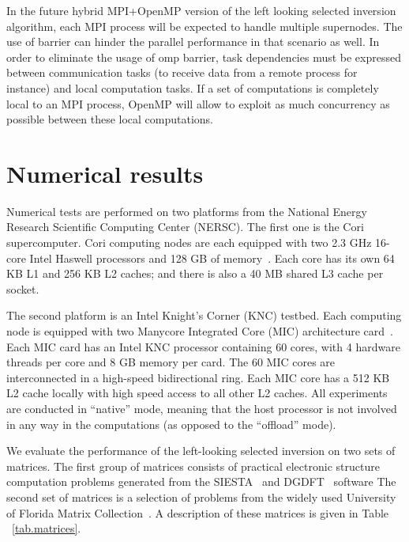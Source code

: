 \documentclass[10pt, conference, compsocconf,letterpaper,twocolumn]{IEEEtran}
\newcommand{\dgdft}{\textsf{DGDFT}\xspace}
\newcommand{\siesta}{\textsf{SIESTA}\xspace}
\begin{document}
In the future hybrid MPI+OpenMP version of the left looking selected inversion algorithm, each MPI process will be expected to handle multiple supernodes. The use of barrier can hinder the parallel performance in that scenario as well. In order to eliminate the usage of \textsf{omp barrier}, task dependencies must be expressed between communication tasks (to receive data from a remote process for instance) and local computation tasks. If a set of computations is completely local to an MPI process, OpenMP will allow to exploit as much concurrency as possible between these local computations.

\section{Numerical results}
\label{sec:example}

Numerical tests are performed on two platforms from the National Energy 
Research Scientific Computing Center (NERSC). The first one is the Cori supercomputer. Cori computing nodes are each equipped with two 2.3 GHz 16-core Intel
Haswell processors and 128 GB of memory~\cite{cori}. Each core has its own 64 KB 
L1 and 256 KB L2 caches; and there is also a 40 MB shared L3 cache per socket. 

The second platform is an Intel Knight's Corner (KNC) testbed. 
Each computing node is equipped with two Manycore Integrated Core (MIC) architecture card~\cite{babbage}. Each MIC
card has an Intel KNC processor containing 60 cores, with 4 hardware threads per
core and 8 GB memory per card. The 60 MIC cores are interconnected in a high-speed
bidirectional ring. Each MIC core has a 512 KB L2 cache locally with high speed
access to all other L2 caches. All experiments are conducted in ``native'' mode,
meaning that the host processor is not involved in any way in the computations
(as opposed to the ``offload'' mode).

We evaluate the performance of the left-looking selected 
inversion on two sets of matrices. The first group of 
matrices consists of practical electronic structure computation problems
generated from the \siesta~\cite{SolerArtachoGaleEtAl2002} and
\dgdft~\cite{LinLuYingE2012,HuLinYang2015a} software
The second set of matrices is a selection of problems from the widely used University of Florida Matrix Collection~\cite{FloridaMatrix}.
A description of these matrices is given in Table ~\ref{tab.matrices}.
\end{document}
